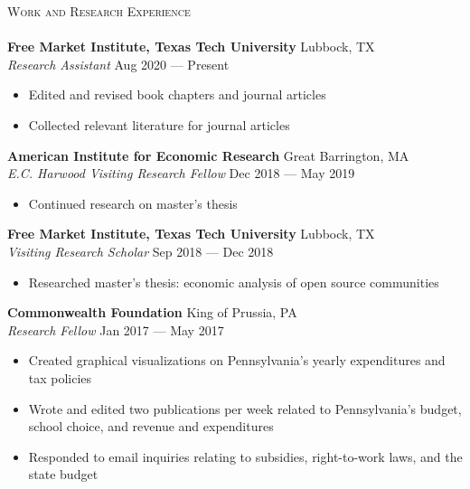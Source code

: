 \documentclass[a4paper,11pt]{article}
\newcommand{\lineunder} {
    \vspace*{-8pt} \\
    \hspace*{-18pt} \hrulefill \\
}
\newcommand{\header} [1] {
    {\hspace*{-18pt}\vspace*{6pt} \textsc{\large{#1}}}
    \vspace*{-6pt} \lineunder
}
\begin{document}
\vspace{1mm}
\header{Work and Research Experience}
\textbf{Free Market Institute, Texas Tech University} \hfill Lubbock, TX\\
\textit{Research Assistant} \hfill Aug 2020 --- Present \\
\begin{itemize}[noitemsep,nolistsep]
    \item Edited and revised book chapters and journal articles
    \item Collected relevant literature for journal articles
\end{itemize}

\textbf{American Institute for Economic Research} \hfill Great Barrington, MA\\
\textit{E.C. Harwood Visiting Research Fellow} \hfill Dec 2018 --- May 2019\\
\begin{itemize}[noitemsep, nolistsep]
    \item Continued research on master's thesis
\end{itemize}
\textbf{Free Market Institute, Texas Tech University} \hfill Lubbock, TX\\
\textit{Visiting Research Scholar} \hfill Sep 2018 --- Dec 2018\\
\begin{itemize}[noitemsep, nolistsep]
    \item Researched master's thesis: economic analysis of open source communities
\end{itemize}

\textbf{Commonwealth Foundation} \hfill King of Prussia, PA\\
\textit{Research Fellow} \hfill Jan 2017 --- May 2017\\
\begin{itemize}[noitemsep,nolistsep]
    \item Created graphical visualizations on Pennsylvania’s yearly expenditures and tax policies
    \item Wrote and edited two publications per week related to Pennsylvania's budget, school choice, and revenue and expenditures
    \item Responded to email inquiries relating to subsidies, right-to-work laws, and the state budget
\end{itemize}
\end{document}
